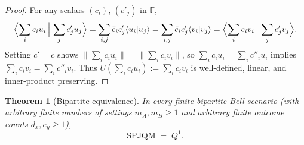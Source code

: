 \documentclass[11pt,a4paper]{article}
\newtheorem{theorem}{Theorem}[section]
\theoremstyle{definition}
\theoremstyle{remark}
\newcommand{\SPJQM}{\mathrm{SPJQM}}
\newcommand{\Qone}{Q^{1}}
\newcommand{\braket}[2]{\langle #1 | #2 \rangle}
\newcommand{\norm}[1]{\|#1\|}
\newcommand{\F}{\mathbb{F}}
\begin{document}
\begin{proof}
For any scalars $(c_i)$, $(c'_j)$ in $\F$,
\[
\Bigl\langle \sum_i c_i u_i \,\Big|\, \sum_j c'_j u_j \Bigr\rangle
= \sum_{i,j} \bar{c}_i c'_j \braket{u_i}{u_j}
= \sum_{i,j} \bar{c}_i c'_j \braket{v_i}{v_j}
= \Bigl\langle \sum_i c_i v_i \,\Big|\, \sum_j c'_j v_j \Bigr\rangle.
\]
Setting $c' = c$ shows $\norm{\sum_i c_i u_i} = \norm{\sum_i c_i v_i}$, so $\sum_i c_i u_i = \sum_i c''_i u_i$ implies $\sum_i c_i v_i = \sum_i c''_i v_i$. Thus $U(\sum_i c_i u_i) := \sum_i c_i v_i$ is well-defined, linear, and inner-product preserving.
\end{proof}

\begin{theorem}[Bipartite equivalence]
\label{thm:bipartite}
In every finite bipartite Bell scenario (with arbitrary finite numbers of settings $m_A, m_B \ge 1$ and arbitrary finite outcome counts $d_x, e_y \ge 1$),
\[
\SPJQM \;=\; \Qone.
\]
\end{theorem}
\end{document}
